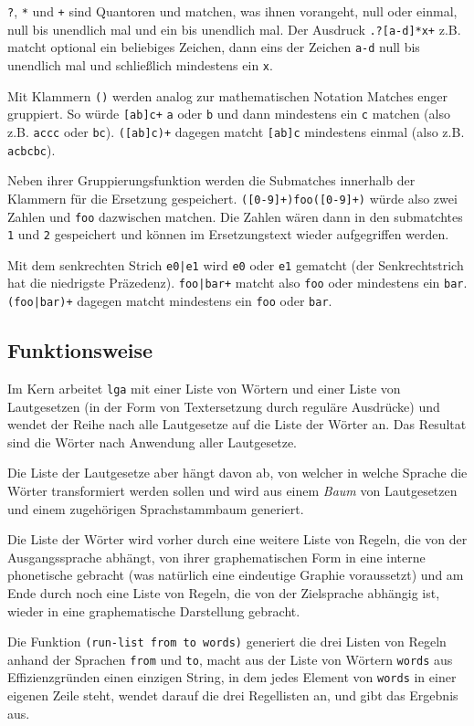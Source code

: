 \documentclass[12pt,a4paper,normalheadings]{scrartcl}
\def\tt#1{\texttt{#1}}
\begin{document}
\tt{?}, \tt{*} und \tt{+} sind Quantoren
und matchen, was ihnen vorangeht, null oder einmal, null bis unendlich mal
und ein bis unendlich mal.
Der Ausdruck \tt{.?[a-d]*x+} z.B.
matcht optional ein beliebiges Zeichen, dann eins der Zeichen \tt{a-d}
null bis unendlich mal und schließlich mindestens ein \tt{x}.

Mit Klammern \tt{()} werden analog zur mathematischen Notation
Matches enger gruppiert.
So würde \tt{[ab]c+} \tt{a} oder \tt{b} und dann mindestens ein
\tt{c} matchen (also z.B. \tt{accc} oder \tt{bc}).
\tt{([ab]c)+} dagegen matcht \tt{[ab]c} mindestens einmal
(also z.B. \tt{acbcbc}).

Neben ihrer Gruppierungsfunktion werden die Submatches innerhalb
der Klammern für die Ersetzung gespeichert.
\tt{([0-9]+)foo([0-9]+)} würde also zwei Zahlen und \tt{foo} dazwischen
matchen.
Die Zahlen wären dann in den submatchtes \tt{1} und \tt{2} gespeichert
und können im Ersetzungstext wieder aufgegriffen werden.

Mit dem senkrechten Strich \tt{e0|e1} wird \tt{e0}
oder \tt{e1} gematcht (der Senkrechtstrich hat die niedrigste Präzedenz).
\tt{foo|bar+} matcht also \tt{foo} oder mindestens ein \tt{bar}.
\tt{(foo|bar)+} dagegen matcht mindestens ein \tt{foo} oder \tt{bar}.

\subsection{Funktionsweise}

Im Kern arbeitet \tt{lga} mit einer Liste von Wörtern
und einer Liste von Lautgesetzen
(in der Form von Textersetzung durch reguläre Ausdrücke)
und wendet der Reihe nach alle Lautgesetze auf die Liste der Wörter an.
Das Resultat sind die Wörter nach Anwendung aller Lautgesetze.

Die Liste der Lautgesetze aber hängt davon ab,
von welcher in welche Sprache die Wörter transformiert werden sollen
und wird aus einem \emph{Baum} von Lautgesetzen und einem
zugehörigen Sprachstammbaum generiert.

Die Liste der Wörter wird vorher durch eine weitere Liste von Regeln,
die von der Ausgangssprache abhängt,
von ihrer graphematischen Form in eine interne phonetische gebracht
(was natürlich eine eindeutige Graphie voraussetzt)
und am Ende durch noch eine Liste von Regeln,
die von der Zielsprache abhängig ist,
wieder in eine graphematische Darstellung gebracht.

Die Funktion \tt{(run-list from to words)}
generiert die drei Listen von Regeln anhand der Sprachen \tt{from} und \tt{to},
macht aus der Liste von Wörtern \tt{words} aus Effizienzgründen einen
einzigen String,
in dem jedes Element von \tt{words} in einer eigenen Zeile steht,
wendet darauf die drei Regellisten an,
und gibt das Ergebnis aus.
\end{document}
